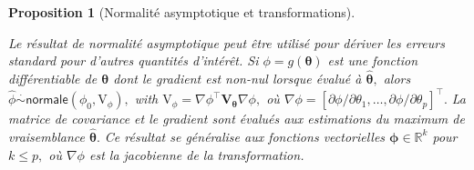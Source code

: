 \documentclass[
  11pt,
  letterpaper,
]{scrbook}
\theoremstyle{plain}
\newtheorem{proposition}{Proposition}[chapter]
\theoremstyle{plain}
\theoremstyle{definition}
\theoremstyle{definition}
\theoremstyle{remark}
\begin{document}
\begin{proposition}[Normalité asymptotique et
transformations]\protect\hypertarget{prp-transformation}{}\label{prp-transformation}

Le résultat de normalité asymptotique peut être utilisé pour dériver les
erreurs standard pour d'autres quantités d'intérêt. Si
\(\phi = g(\boldsymbol{\theta})\) est une fonction différentiable de
\(\boldsymbol{\theta}\) dont le gradient est non-nul lorsque évalué à
\(\widehat{\boldsymbol{\theta}},\) alors
\(\widehat{\phi} \stackrel{\cdot}{\sim}\mathsf{normale}(\phi_0, \mathrm{V}_\phi),\)
with
\(\mathrm{V}_\phi = \nabla \phi^\top \mathbf{V}_{\boldsymbol{\theta}} \nabla \phi,\)
où
\(\nabla \phi=[\partial \phi/\partial \theta_1, \ldots, \partial \phi/\partial \theta_p]^\top.\)
La matrice de covariance et le gradient sont évalués aux estimations du
maximum de vraisemblance \(\widehat{\boldsymbol{\theta}}.\) Ce résultat
se généralise aux fonctions vectorielles
\(\boldsymbol{\phi} \in \mathbb{R}^k\) pour \(k \leq p,\) où
\(\nabla \phi\) est la jacobienne de la transformation.

\end{proposition}
\end{document}
